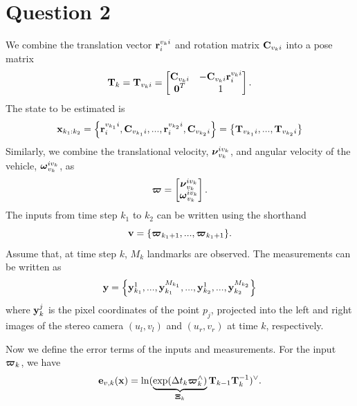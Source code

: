 \documentclass[a4paper]{article}
\begin{document}
\section*{Question 2}

We combine the translation vector $\bm{\mathbf{r}}_i^{v_k i}$ and rotation matrix $\bm{\mathbf{C}}_{v_k i}$ into a pose matrix
\begin{equation}
\bm{\mathbf{T}}_k = \bm{\mathbf{T}}_{v_k i} = \begin{bmatrix}
  \bm{\mathbf{C}}_{v_k i} & -\bm{\mathbf{C}}_{v_k i} \bm{\mathbf{r}}_i^{v_k i} \\ \bm{\mathbf{0}}^T & 1
\end{bmatrix}.
\end{equation}
The state to be estimated is
\begin{equation}
    \bm{\mathbf{x}}_{k_1: k_2} = \left\{ \bm{\mathbf{r}}_i^{v_{k_1} i}, \bm{\mathbf{C}}_{v_{k_1} i}, ..., \bm{\mathbf{r}}_i^{v_{k_2} i}, \bm{\mathbf{C}}_{v_{k_2} i} \right\} = \left\{ \bm{\mathbf{T}}_{v_{k_1} i}, ..., \bm{\mathbf{T}}_{v_{k_2} i} \right\}
\end{equation}
Similarly, we combine the translational velocity, $\bm{\mathbf{\nu}}_{v_k}^{i v_k}$, and angular velocity of the vehicle, $\bm{\mathbf{\omega}}_{v_k}^{i v_k}$, as 
\begin{equation}
    \bm{\mathbf{\varpi}} = \begin{bmatrix}
      \bm{\mathbf{\nu}}_{v_k}^{i v_k} \\ \bm{\mathbf{\omega}}_{v_k}^{i v_k}
    \end{bmatrix}.
\end{equation}
The inputs from time step $k_1$ to $k_2$ can be written using the shorthand
\begin{equation}
    \bm{\mathbf{v}} = \{ \bm{\mathbf{\varpi}}_{k_1+1}, ..., \bm{\mathbf{\varpi}}_{k_1+1} \}.
\end{equation}
Assume that, at time step $k$, $M_k$ landmarks are observed. The measurements can be written as
\begin{equation}
    \bm{\mathbf{y}} = \left\{ \bm{\mathbf{y}}^{1}_{k_1}, ..., \bm{\mathbf{y}}^{M_{k_1}}_{k_1}, ..., \bm{\mathbf{y}}^{1}_{k_2}, ..., \bm{\mathbf{y}}^{M_{k_2}}_{k_2} \right\} 
\end{equation}
where $\bm{\mathbf{y}}_k^j$ is the pixel coordinates of the point $p_j$, projected into the left and right images of the stereo camera $(u_l, v_l)$ and $(u_r, v_r)$ at time $k$, respectively.

Now we define the error terms of the inputs and measurements. For the input $\bm{\mathbf{\varpi}}_k$, we have 
\begin{equation}
    \bm{\mathbf{e}}_{v, k}(\bm{\mathbf{x}}) = \ln (\underbrace{\exp(\Delta t_k \bm{\mathbf{\varpi}}_k^\wedge)}_{\bm{\mathbf{\Xi}}_k} \bm{\mathbf{T}}_{k-1} \bm{\mathbf{T}}_k^{-1})^\vee.
\end{equation}
\end{document}
